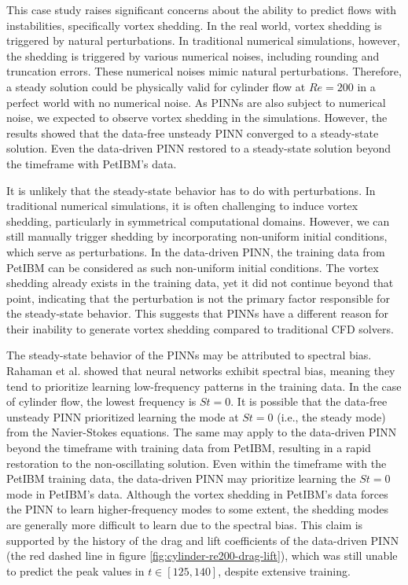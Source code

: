 
This case study raises significant concerns about the ability to predict flows with instabilities, specifically vortex shedding.
In the real world, vortex shedding is triggered by natural perturbations.
In traditional numerical simulations, however, the shedding is triggered by various numerical noises, including rounding and truncation errors.
These numerical noises mimic natural perturbations.
Therefore, a steady solution could be physically valid for cylinder flow at $Re = 200$ in a perfect world with no numerical noise.
As PINNs are also subject to numerical noise, we expected to observe vortex shedding in the simulations.
However, the results showed that the data-free unsteady PINN converged to a steady-state solution.
Even the data-driven PINN restored to a steady-state solution beyond the timeframe with PetIBM's data.

It is unlikely that the steady-state behavior has to do with perturbations.
In traditional numerical simulations, it is often challenging to induce vortex shedding, particularly in symmetrical computational domains.
However, we can still manually trigger shedding by incorporating non-uniform initial conditions, which serve as perturbations.
In the data-driven PINN, the training data from PetIBM can be considered as such non-uniform initial conditions.
The vortex shedding already exists in the training data, yet it did not continue beyond that point, indicating that the perturbation is not the primary factor responsible for the steady-state behavior.
This suggests that PINNs have a different reason for their inability to generate vortex shedding compared to traditional CFD solvers.

The steady-state behavior of the PINNs may be attributed to spectral bias.
Rahaman et al. \cite{rahaman_spectral_2019} showed that neural networks exhibit spectral bias, meaning they tend to prioritize learning low-frequency patterns in the training data.
In the case of cylinder flow, the lowest frequency is $St=0$.
It is possible that the data-free unsteady PINN prioritized learning the mode at $St=0$ (i.e., the steady mode) from the Navier-Stokes equations.
The same may apply to the data-driven PINN beyond the timeframe with training data from PetIBM, resulting in a rapid restoration to the non-oscillating solution.
Even within the timeframe with the PetIBM training data, the data-driven PINN may prioritize learning the $St=0$ mode in PetIBM's data.
Although the vortex shedding in PetIBM's data forces the PINN to learn higher-frequency modes to some extent, the shedding modes are generally more difficult to learn due to the spectral bias.
This claim is supported by the history of the drag and lift coefficients of the data-driven PINN (the red dashed line in figure \ref{fig:cylinder-re200-drag-lift}), which was still unable to predict the peak values in $t \in \left[125, 140\right]$, despite extensive training.

